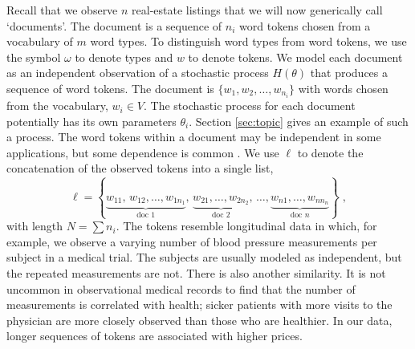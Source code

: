 \documentclass[12pt]{article}
\begin{document}
 Recall that we observe $n$ real-estate listings that we will now generically
 call `documents'.  The \ith document is a sequence of $n_i$ word tokens 
 chosen from a vocabulary of $m$ word types.  To distinguish word types
 from word tokens, we use the symbol $\omega$ to denote types and $w$ to denote
 tokens.  We model each document as an independent observation of a stochastic
 process $H(\theta)$ that produces a sequence of word tokens.
  The \ith document is $\{w_1, w_2, \ldots, w_{n_i}\}$ with
 words chosen from the vocabulary, $w_i \in V$.  The stochastic process for each document 
 potentially has its own parameters $\theta_i$.  Section \ref{sec:topic} gives an example of such a
 process.  The word tokens within a document may be independent in some
 applications, but some dependence is common \citep[\eg][]{fosterkakade07}.
 We use $\ell$ to denote the concatenation of the observed tokens into a single list,
\begin{equation*}
   \ell = \left\{ \underbrace{w_{11},\,w_{12},\ldots,w_{1n_1}}_{\mbox{doc 1}},\,
            \underbrace{w_{21},\ldots,w_{2n_2}}_{\mbox{doc 2}}, \,
            \ldots, \underbrace{w_{n1},\ldots,w_{nn_n}}_{\mbox{doc }n} \right\}\;,
\end{equation*}
 with length $N = \sum n_i$.  The tokens resemble
  longitudinal data in which, for example, we observe a varying number
 of blood pressure measurements per subject in a medical trial.
 The subjects are usually modeled as independent,
 but the repeated measurements are not.  There is also another similarity. It is not uncommon in observational medical records to find that
 the number of measurements is correlated with health; sicker
 patients with more visits to the physician are more closely observed than those who are healthier.  In our data, longer sequences of tokens are associated with higher prices.
\end{document}
